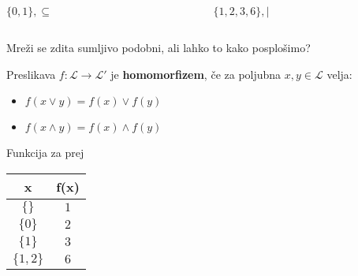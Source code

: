\documentclass[slovene]{beamer}
\begin{document}
\begin{frame}
\begin{columns}
\begin{column}{5cm}
\begin{center}
$\{0,1\}, \subseteq$
\end{center}
\begin{figure}
\centering
{}
\end{figure}
\end{column}

\begin{column}{5cm}
\begin{center}
$\{1,2,3,6\}, |$
\end{center}
\begin{figure}
\centering
{}
\end{figure}
\end{column}
\end{columns}

\begin{block}{}
Mreži se zdita sumljivo podobni, ali lahko to kako posplošimo?
\end{block}

\end{frame}

\begin{frame}
\begin{definition}
Preslikava $f :\mathcal{L} \to \mathcal{L}'$ je \textbf{homomorfizem}, če za poljubna $x,y \in \mathcal{L}$ velja:
\begin{itemize}
\item $f(x \lor y) = f(x) \lor f(y)$
\item $f(x \land y) = f(x) \land f(y)$
\end{itemize}
\end{definition}



\begin{block}{Funkcija za prej}
\begin{table}[]
\centering
\label{my-label}
\begin{tabular}{c|c}
x         & f(x) \\ \hline
$\{\}$    & $1$  \\
$\{0\}$   & $2$  \\
$\{1\}$   & $3$  \\
$\{1,2\}$ & $6$ 
\end{tabular}
\end{table}
\end{block}

\end{frame}
\end{document}
